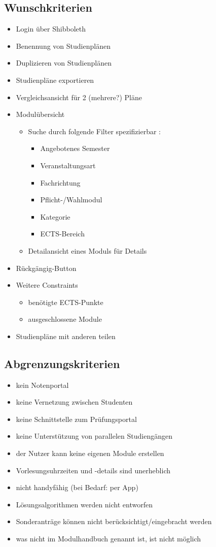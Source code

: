 \subsection{Wunschkriterien}
\label{subsec:project_goals-wunschkriterien}
\begin{itemize}[nosep]
	\item  Login über Shibboleth	
	\item Benennung von Studienplänen
	\item Duplizieren von Studienplänen
	\item Studienpläne exportieren
	\item Vergleichsansicht für 2 (mehrere?) Pläne 
	\item Modulübersicht
	\begin{itemize}[nosep]	
		\item Suche durch folgende Filter spezifizierbar : 
		\begin{itemize}[nosep]
			\item Angebotenes Semester
			\item Veranstaltungsart
			\item Fachrichtung
			\item Pflicht-/Wahlmodul
			\item Kategorie
			\item ECTS-Bereich
		\end{itemize}
		\item Detailansicht eines Moduls für Details
	\end{itemize}
	\item Rückgängig-Button
	\item Weitere Constraints
	\begin{itemize}[nosep]
		\item benötigte ECTS-Punkte
		\item ausgeschlossene Module
	\end{itemize}
	\item Studienpläne mit anderen teilen
\end{itemize}
\subsection{Abgrenzungskriterien}
\begin{itemize}[nosep]
	\item kein Notenportal
	\item keine Vernetzung zwischen Studenten
	\item keine Schnittstelle zum Prüfungsportal
	\item keine Unterstützung von parallelen Studiengängen
	\item der Nutzer kann keine eigenen Module erstellen
	\item Vorlesungsuhrzeiten und -details sind unerheblich
	\item nicht handyfähig (bei Bedarf: per App)
	\item Lösungsalgorithmen werden nicht entworfen
	\item Sonderanträge können nicht berücksichtigt/eingebracht werden
	\item was nicht im Modulhandbuch genannt ist, ist nicht möglich
\end{itemize}